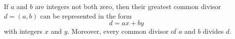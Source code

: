 If $a$ and $b$ are integers not both zero, then their greatest common divisor $d = (a,b)$ can be represented in the form
$$d = ax + by$$
with integers $x$ and $y$. Moreover, every common divisor of $a$ and $b$ divides $d$.
